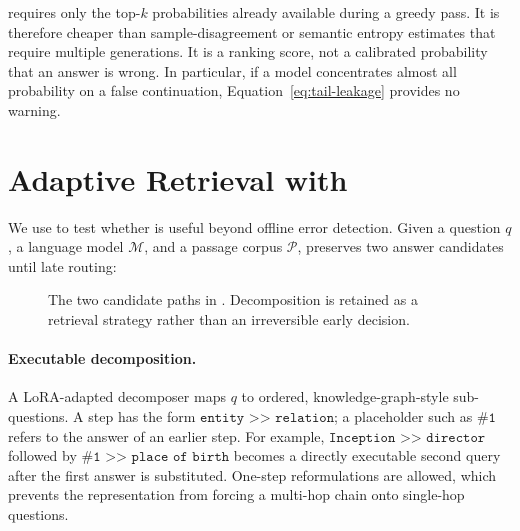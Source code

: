\tailleak{} requires only the top-\(k\) probabilities already available during
a greedy pass. It is therefore cheaper than sample-disagreement or semantic
entropy estimates that require multiple generations. It is a ranking score,
not a calibrated probability that an answer is wrong. In particular, if a
model concentrates almost all probability on a false continuation,
Equation~\ref{eq:tail-leakage} provides no warning.

\section{Adaptive Retrieval with \method{}}
\label{sec:seek}

We use \method{} to test whether \tailleak{} is useful beyond offline error
detection. Given a question \(q\), a language model \(\mathcal{M}\), and a
passage corpus \(\mathcal{P}\), \method{} preserves two answer candidates until
late routing:

\begin{figure}[t]
\centering
\small
\setlength{\fboxsep}{6pt}
\caption{The two candidate paths in \method{}. Decomposition is retained as a
retrieval strategy rather than an irreversible early decision.}
\label{fig:seek-overview}
\end{figure}

\paragraph{Executable decomposition.}
A LoRA-adapted decomposer maps \(q\) to ordered, knowledge-graph-style
sub-questions. A step has the form
\(\texttt{entity >> relation}\); a placeholder such as \(\texttt{\#1}\)
refers to the answer of an earlier step. For example,
\(\texttt{Inception >> director}\) followed by
\(\texttt{\#1 >> place of birth}\) becomes a directly executable second query
after the first answer is substituted. One-step reformulations are allowed,
which prevents the representation from forcing a multi-hop chain onto
single-hop questions.

